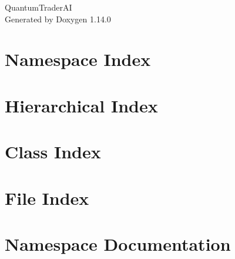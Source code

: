 \documentclass[twoside]{book}
\newcommand{\+}{\discretionary{\mbox{\scriptsize$\hookleftarrow$}}{}{}}
\newcommand{\clearemptydoublepage}{%
    \newpage{\pagestyle{empty}\cleardoublepage}%
  }
\begin{document}
  \raggedbottom
    \hypersetup{pageanchor=false,
                bookmarksnumbered=true,
                pdfencoding=unicode
               }
  \begin{titlepage}
  \vspace*{7cm}
  \begin{center}%
  {\Large Quantum\+Trader\+AI}\\
  \vspace*{1cm}
  {\large Generated by Doxygen 1.14.0}\\
  \end{center}
  \end{titlepage}
  \clearemptydoublepage
  \tableofcontents
  \clearemptydoublepage
  \hypersetup{pageanchor=true}

\chapter{Namespace Index}

\chapter{Hierarchical Index}

\chapter{Class Index}

\chapter{File Index}

\chapter{Namespace Documentation}







































\end{document}
